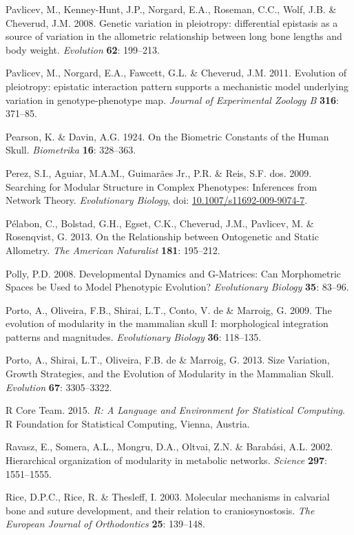 \documentclass[12pt,]{article}
\begin{document}
Pavlicev, M., Kenney-Hunt, J.P., Norgard, E.A., Roseman, C.C., Wolf,
J.B. \& Cheverud, J.M. 2008. Genetic variation in pleiotropy:
differential epistasis as a source of variation in the allometric
relationship between long bone lengths and body weight. \emph{Evolution}
\textbf{62}: 199--213.

Pavlicev, M., Norgard, E.A., Fawcett, G.L. \& Cheverud, J.M. 2011.
Evolution of pleiotropy: epistatic interaction pattern supports a
mechanistic model underlying variation in genotype-phenotype map.
\emph{Journal of Experimental Zoology B} \textbf{316}: 371--85.

Pearson, K. \& Davin, A.G. 1924. On the Biometric Constants of the Human
Skull. \emph{Biometrika} \textbf{16}: 328--363.

Perez, S.I., Aguiar, M.A.M., Guimarães Jr., P.R. \& Reis, S.F. dos.
2009. Searching for Modular Structure in Complex Phenotypes: Inferences
from Network Theory. \emph{Evolutionary Biology}, doi:
\href{http://dx.doi.org/10.1007/s11692-009-9074-7}{10.1007/s11692-009-9074-7}.

Pélabon, C., Bolstad, G.H., Egset, C.K., Cheverud, J.M., Pavlicev, M. \&
Rosenqvist, G. 2013. On the Relationship between Ontogenetic and Static
Allometry. \emph{The American Naturalist} \textbf{181}: 195--212.

Polly, P.D. 2008. Developmental Dynamics and G-Matrices: Can
Morphometric Spaces be Used to Model Phenotypic Evolution?
\emph{Evolutionary Biology} \textbf{35}: 83--96.

Porto, A., Oliveira, F.B., Shirai, L.T., Conto, V. de \& Marroig, G.
2009. The evolution of modularity in the mammalian skull I:
morphological integration patterns and magnitudes. \emph{Evolutionary
Biology} \textbf{36}: 118--135.

Porto, A., Shirai, L.T., Oliveira, F.B. de \& Marroig, G. 2013. Size
Variation, Growth Strategies, and the Evolution of Modularity in the
Mammalian Skull. \emph{Evolution} \textbf{67}: 3305--3322.

R Core Team. 2015. \emph{R: A Language and Environment for Statistical
Computing}. R Foundation for Statistical Computing, Vienna, Austria.

Ravasz, E., Somera, A.L., Mongru, D.A., Oltvai, Z.N. \& Barabási, A.L.
2002. Hierarchical organization of modularity in metabolic networks.
\emph{Science} \textbf{297}: 1551--1555.

Rice, D.P.C., Rice, R. \& Thesleff, I. 2003. Molecular mechanisms in
calvarial bone and suture development, and their relation to
craniosynostosis. \emph{The European Journal of Orthodontics}
\textbf{25}: 139--148.
\end{document}
